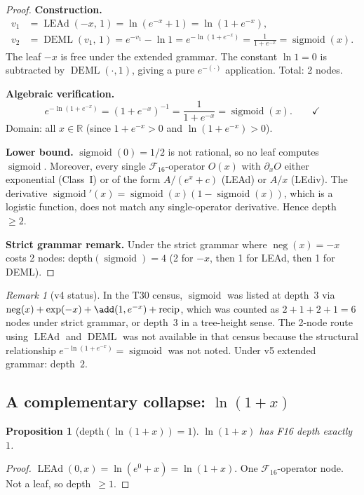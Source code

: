\documentclass[12pt,a4paper]{article}
\newtheorem{proposition}[theorem]{Proposition}
\theoremstyle{definition}
\theoremstyle{remark}
\newtheorem{remark}[theorem]{Remark}
\newcommand{\DEML}{\operatorname{DEML}}
\newcommand{\LEAd}{\operatorname{LEAd}}
\newcommand{\negop}{\operatorname{neg}}
\newcommand{\recip}{\operatorname{recip}}
\newcommand{\sigmoid}{\operatorname{sigmoid}}
\newcommand{\F}{\mathcal{F}_{16}}
\newcommand{\R}{\mathbb{R}}
\begin{document}
\begin{proof}
\textbf{Construction.}
\begin{align*}
  v_1 &= \LEAd(-x,\, 1) = \ln(e^{-x} + 1) = \ln(1 + e^{-x}), \\
  v_2 &= \DEML(v_1,\, 1) = e^{-v_1} - \ln 1 = e^{-\ln(1+e^{-x})} = \frac{1}{1+e^{-x}} = \sigmoid(x).
\end{align*}
The leaf $-x$ is free under the extended grammar.  The constant $\ln 1 = 0$ is
subtracted by $\DEML(\cdot, 1)$, giving a pure $e^{-(\cdot)}$ application.
Total: 2 nodes.

\textbf{Algebraic verification.}
\[
  e^{-\ln(1+e^{-x})} = (1+e^{-x})^{-1} = \frac{1}{1+e^{-x}} = \sigmoid(x). \qquad\checkmark
\]
Domain: all $x\in\R$ (since $1+e^{-x} > 0$ and $\ln(1+e^{-x}) > 0$).

\textbf{Lower bound.}
$\sigmoid(0) = 1/2$ is not rational, so no leaf computes $\sigmoid$.
Moreover, every single $\F$-operator $O(x)$ with $\partial_x O$ either exponential
(Class~I) or of the form $A/(e^x + c)$ (LEAd) or $A/x$ (LEdiv).
The derivative $\sigmoid'(x) = \sigmoid(x)(1-\sigmoid(x))$, which is a logistic
function, does not match any single-operator derivative.  Hence depth~$\geq 2$.

\textbf{Strict grammar remark.}
Under the strict grammar where $\negop(x) = -x$ costs 2 nodes:
depth$(\sigmoid) = 4$ (2 for $-x$, then 1 for LEAd, then 1 for DEML).
\end{proof}

\begin{remark}[v4 status]
In the T30 census, $\sigmoid$ was listed at depth~$3$ via
$\negop(x) + \exp(-x) + \add(1, e^{-x}) + \recip$,
which was counted as $2+1+2+1 = 6$ nodes under strict grammar, or depth~$3$ in
a tree-height sense.  The 2-node route using $\LEAd$ and $\DEML$ was not available
in that census because the structural relationship $e^{-\ln(1+e^{-x})} = \sigmoid$
was not noted.  Under v5 extended grammar: depth~$2$.
\end{remark}

\subsection{A complementary collapse: $\ln(1+x)$}

\begin{proposition}[depth$(\ln(1+x)) = 1$]
$\ln(1+x)$ has F16 depth exactly~$1$.
\end{proposition}

\begin{proof}
$\LEAd(0, x) = \ln(e^0 + x) = \ln(1 + x)$.  One $\F$-operator node.
Not a leaf, so depth~$\geq 1$.
\end{proof}
\end{document}
